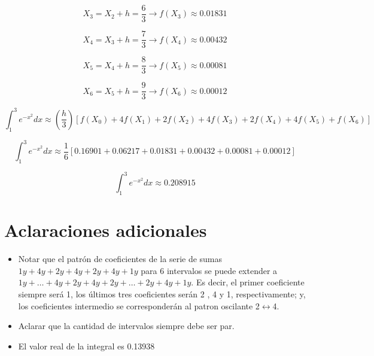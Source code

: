 \documentclass{article}
\begin{document}
\begin{equation}
    X_{3} = X_{2} + h = \frac{6}{3} \rightarrow f(X_{3}) \approx 0.01831
\end{equation}

\begin{equation}
    X_{4} = X_{3} + h = \frac{7}{3} \rightarrow f(X_{4}) \approx 0.00432
\end{equation}

\begin{equation}
    X_{5} = X_{4} + h = \frac{8}{3} \rightarrow f(X_{5}) \approx 0.00081
\end{equation}

\begin{equation}
    X_{6} = X_{5} + h = \frac{9}{3} \rightarrow f(X_{6}) \approx 0.00012
\end{equation}

\begin{equation}
    \int_{1}^{3} e^{-x^{2}} dx \approx (\frac{h}{3}) [f(X_{0}) + 4f(X_{1}) + 2f(X_{2}) + 4f(X_{3}) + 2f(X_{4}) + 4f(X_{5}) + f(X_{6})]
\end{equation}

\begin{equation}
    \int_{1}^{3} e^{-x^{2}} dx \approx \frac{1}{6} [0.16901 + 0.06217 + 0.01831 + 0.00432 + 0.00081 + 0.00012]
\end{equation}

\begin{equation}
    \int_{1}^{3} e^{-x^{2}} dx \approx 0.208915
\end{equation}

\section*{Aclaraciones adicionales}
\begin{itemize}
    \item Notar que el patrón de coeficientes de la serie de sumas $1y + 4y + 2y + 4y + 2y + 4y + 1y$ para 6 intervalos se puede extender a $1y + \dots +  4y + 2y + 4y + 2y + \dots + 2y + 4y + 1y$. Es decir, el primer coeficiente siempre será 1, los últimos tres coeficientes serán 2 , 4 y 1, respectivamente; y, los coeficientes intermedio se corresponderán al patron oscilante 2$\leftrightarrow$4.
    \item Aclarar que la cantidad de intervalos siempre debe ser par.
    \item El valor real de la integral es 0.13938
\end{itemize}
\end{document}
